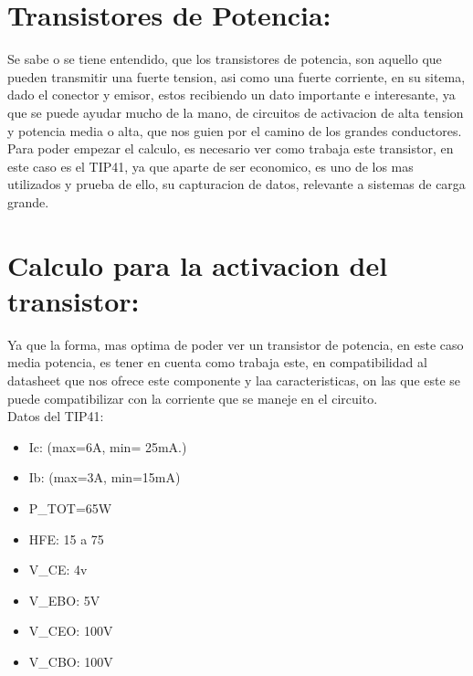 \documentclass[12pt,a4paper]{article}
\begin{document}
\section{Transistores de Potencia:}

Se sabe o se tiene entendido, que los transistores de potencia, son aquello que pueden transmitir una fuerte tension, asi como una fuerte corriente, en su sitema, dado el conector y emisor, estos recibiendo un dato importante e interesante, ya que se puede ayudar mucho de la mano, de circuitos de activacion de alta tension y potencia media o alta, que nos guien por el camino de los grandes conductores.\\

Para poder empezar el calculo, es necesario ver como trabaja este transistor, en este caso es el TIP41, ya que aparte de ser economico, es uno de los mas utilizados y prueba de ello, su capturacion de datos, relevante a sistemas de carga grande.\\

\section{Calculo para la activacion del transistor:}

Ya que la forma, mas optima de poder ver un transistor de potencia, en este caso media potencia, es tener en cuenta como trabaja este, en compatibilidad al datasheet que nos ofrece este componente y laa caracteristicas, on las que este se puede compatibilizar con la corriente que se maneje en el circuito.\\

Datos del TIP41:\\
\begin{itemize}
\item Ic: (max=6A, min= 25mA.)
\item Ib: (max=3A, min=15mA)
\item P_{TOT}=65W\\
\item HFE: 15 a 75\\
\item V_{CE}: 4v\\
\item V_{EBO}: 5V\\
\item V_{CEO}: 100V\\
\item V_{CBO}: 100V\\
\end{itemize}
 
\end{document}
